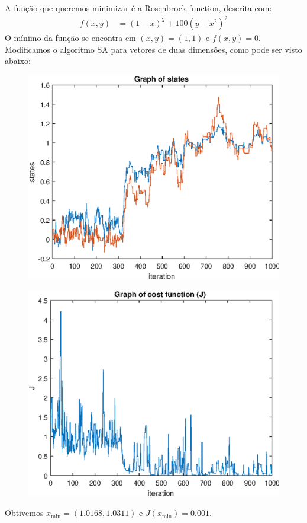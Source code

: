 \documentclass[12pt]{article}
\newenvironment{exercise}[2][Exercício]{\begin{trivlist}
\item[\hskip \labelsep {\bfseries #1}\hskip \labelsep {\bfseries #2.}]}{\end{trivlist}}
\begin{document}
\begin{exercise}{5}
A função que queremos minimizar é a Rosenbrock function, descrita com:
\begin{align*}
f(x,y) &= (1-x)^2 + 100(y-x^2)^2
\end{align*}
O mínimo da função se encontra em $(x,y) = (1,1)$ e $f(x,y) = 0$. Modificamos o
algoritmo SA para vetores de duas dimensões, como pode ser visto abaixo:



\begin{figure}[H]
  \centering
  \includegraphics[width=12cm]{figs/ex5_states.eps} 
\end{figure}

\begin{figure}[H]
  \centering
  \includegraphics[width=12cm]{figs/ex5_j.eps} 
\end{figure}

Obtivemos $x_{\text{min}} = (1.0168, 1.0311)$ e $J(x_{\text{min}}) = 0.001$.

\end{exercise}
 
\end{document}
